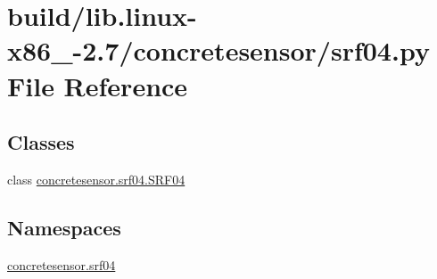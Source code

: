 \hypertarget{build_2lib_8linux-x86__64-2_87_2concretesensor_2srf04_8py}{}\section{build/lib.linux-\/x86\+\_-\/2.7/concretesensor/srf04.py File Reference}
\label{build_2lib_8linux-x86__64-2_87_2concretesensor_2srf04_8py}
\subsection*{Classes}
\begin{DoxyCompactItemize}
\item 
class \hyperlink{classconcretesensor_1_1srf04_1_1SRF04}{concretesensor.\+srf04.\+S\+R\+F04}
\end{DoxyCompactItemize}
\subsection*{Namespaces}
\begin{DoxyCompactItemize}
\item 
 \hyperlink{namespaceconcretesensor_1_1srf04}{concretesensor.\+srf04}
\end{DoxyCompactItemize}
